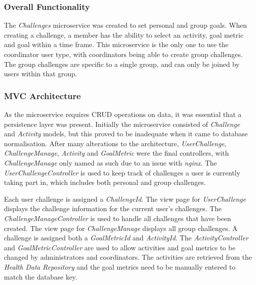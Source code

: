 \subsubsection{Overall Functionality}
\par
The \textit{Challenges} microservice was created to set personal and group goals. When creating a challenge, a member has the ability to select an activity, goal metric and goal within a time frame. This microservice is the only one to use the coordinator user type, with coordinators being able to create group challenges. The group challenges are specific to a single group, and can only be joined by users within that group.

\subsubsection{MVC Architecture}
\par
As the microservice requires CRUD operations on data, it was essential that a persistence layer was present.
Initially the microservice consisted of \textit{Challenge} and \textit{Activity} models, but this proved to be inadequate when it came to database normalisation. After many alterations to the architecture, \textit{UserChallenge}, \textit{ChallengeManage}, \textit{Activity} and \textit{GoalMetric} were the final controllers, with \textit{ChallengeManage} only named as such due to an issue with \textit{nginx}. The \textit{UserChallengeController} is used to keep track of challenges a user is currently taking part in, which includes both personal and group challenges.

\par
Each user challenge is assigned a \textit{ChallengeId}. The view page for \textit{UserChallenge} displays the challenge information for the current user's challenges. The \textit{ChallengeManageController} is used to handle all challenges that have been created. The view page for \textit{ChallengeManage} displays all group challenges. A challenge is assigned both a \textit{GoalMetricId} and \textit{ActivityId}. The \textit{ActivityController} and \textit{GoalMetricController} are used to allow activities and goal metrics to be changed by administrators and coordinators. The activities are retrieved from the \textit{Health Data Repository} and the goal metrics need to be manually entered to match the database key.

